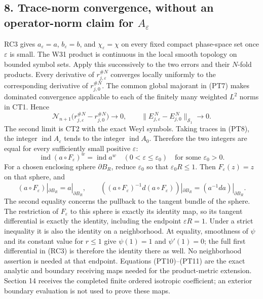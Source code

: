 \documentclass[
  11pt,
]{article}
\begin{document}
\subsection{\texorpdfstring{8. Trace-norm convergence, without an
operator-norm claim for
\(A_\varepsilon\)}{8. Trace-norm convergence, without an operator-norm claim for A\_\textbackslash varepsilon}}\label{trace-norm-convergence-without-an-operator-norm-claim-for-a_varepsilon}

RC3 gives \(a_\varepsilon=a\), \(b_\varepsilon=b\), and
\(\chi_\varepsilon=\chi\) on every fixed compact phase-space set once
\(\varepsilon\) is small. The W31 product is continuous in the local
smooth topology on bounded symbol sets. Apply this successively to the
two errors and their \(N\)-fold products. Every derivative of
\(r_{j,\varepsilon}^{\#N}\) converges locally uniformly to the
corresponding derivative of \(r_{j,0}^{\#N}\). The common global
majorant in (PT7) makes dominated convergence applicable to each of the
finitely many weighted \(L^2\) norms in CT1. Hence \[
 \mathcal N_{n+1}
   \bigl(r_{j,\varepsilon}^{\#N}
         -r_{j,0}^{\#N}\bigr)\longrightarrow0,\qquad
 \|E_{j,\varepsilon}^{\,N}
       -E_{j,0}^{\,N}\|_{\mathcal S_1}\longrightarrow0 .
 \tag{PT9}
\] The second limit is CT2 with the exact Weyl symbols. Taking traces in
(PT8), the integer \(\operatorname{ind}A_\varepsilon\) tends to the
integer \(\operatorname{ind}A_0\). Therefore the two integers are equal
for every sufficiently small positive \(\varepsilon\): \[
 \operatorname{ind}(a\circ F_\varepsilon)^w
       =\operatorname{ind}a^w
       \quad(0<\varepsilon\le\varepsilon_0)
       \quad\text{for some }\varepsilon_0>0 .
 \tag{PT10}
\] For a chosen enclosing sphere \(\partial B_R\), reduce
\(\varepsilon_0\) so that \(\varepsilon_0R\le1\). Then
\(F_\varepsilon(z)=z\) on that sphere, and \[
 (a\circ F_\varepsilon)|_{\partial B_R}
       =a|_{\partial B_R},\qquad
 ((a\circ F_\varepsilon)^{-1}d(a\circ F_\varepsilon))
       |_{\partial B_R}
       =(a^{-1}da)|_{\partial B_R}.
 \tag{PT11}
\] The second equality concerns the pullback to the tangent bundle of
the sphere. The restriction of \(F_\varepsilon\) to this sphere is
exactly its identity map, so its tangent differential is exactly the
identity, including the endpoint \(\varepsilon R=1\). Under a strict
inequality it is also the identity on a neighborhood. At equality,
smoothness of \(\psi\) and its constant value for \(r\leq1\) give
\(\psi(1)=1\) and \(\psi'(1)=0\); the full first differential in (RC3)
is therefore the identity there as well. No neighborhood assertion is
needed at that endpoint. Equations (PT10)--(PT11) are the exact analytic
and boundary receiving maps needed for the product-metric extension.
Section 14 receives the completed finite ordered isotropic coefficient;
an exterior boundary evaluation is not used to prove these maps.
\end{document}
